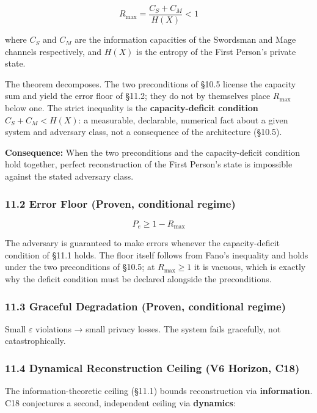 \documentclass[
  11pt,
]{article}
\begin{document}
\[R_{\max} = \frac{C_S + C_M}{H(X)} < 1\]

where \(C_S\) and \(C_M\) are the information capacities of the
Swordsman and Mage channels respectively, and \(H(X)\) is the entropy of
the First Person's private state.

The theorem decomposes. The two preconditions of §10.5 license the
capacity sum and yield the error floor of §11.2; they do not by
themselves place \(R_{\max}\) below one. The strict inequality is the
\textbf{capacity-deficit condition} \(C_S + C_M < H(X)\): a measurable,
declarable, numerical fact about a given system and adversary class, not
a consequence of the architecture (§10.5).

\textbf{Consequence:} When the two preconditions and the
capacity-deficit condition hold together, perfect reconstruction of the
First Person's state is impossible against the stated adversary class.

\subsubsection{11.2 Error Floor (Proven, conditional
regime)}\label{error-floor-proven-conditional-regime}

\[P_e \geq 1 - R_{\max}\]

The adversary is guaranteed to make errors whenever the capacity-deficit
condition of §11.1 holds. The floor itself follows from Fano's
inequality and holds under the two preconditions of §10.5; at
\(R_{\max} \geq 1\) it is vacuous, which is exactly why the deficit
condition must be declared alongside the preconditions.

\subsubsection{11.3 Graceful Degradation (Proven, conditional
regime)}\label{graceful-degradation-proven-conditional-regime}

Small \(\varepsilon\) violations → small privacy losses. The system
fails gracefully, not catastrophically.

\subsubsection{11.4 Dynamical Reconstruction Ceiling (V6 Horizon,
C18)}\label{dynamical-reconstruction-ceiling-v6-horizon-c18}

The information-theoretic ceiling (§11.1) bounds reconstruction via
\textbf{information}. C18 conjectures a second, independent ceiling via
\textbf{dynamics}:
\end{document}
